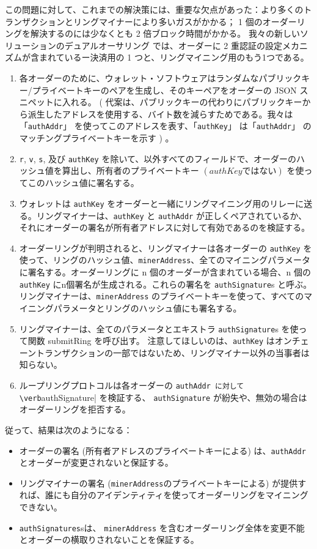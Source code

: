 \documentclass{article}
\begin{document}
\begin{multicols}{2}
この問題に対して、これまでの解決策には、重要な欠点があった：より多くのトランザクションとリングマイナーにより多いガスがかかる； 1 個のオーダーリングを解決するのには少なくとも 2 倍ブロック時間がかかる。 我々の新しいソリューションのデュアルオーサリング \cite{dualauthor} では、オーダーに 2 重認証の設定メカニズムが含まれているー決済用の 1 つと、リングマイニング用のもう1つである。

\begin{enumerate}
	\item 各オーダーのために、ウォレット・ソフトウェアはランダムなパブリックキー/プライベートキーのペアを生成し、そのキーペアをオーダーの JSON スニペットに入れる。 ( 代案は、パブリックキーの代わりにパブリックキーから派生したアドレスを使用する、バイト数を減らすためである。我々は「\verb|authAddr|」 を使ってこのアドレスを表す、「\verb|authKey|」 は「\verb|authAddr|」 のマッチングプライベートキーを示す ) 。
    \item \verb|r|, \verb|v|, \verb|s|, 及び \verb|authKey| を除いて、以外すべてのフィールドで、オーダーのハッシュ値を算出し、所有者のプライベートキー $\left(authKeyではない\right)$ を使ってこのハッシュ値に署名する。
	\item ウォレットは \verb|authKey| をオーダーと一緒にリングマイニング用のリレーに送る。リングマイナーは、\verb|authKey| と \verb|authAddr| が正しくペアされているか、それにオーダーの署名が所有者アドレスに対して有効であるのを検証する。
	\item オーダーリングが判明されると、リングマイナーは各オーダーの \verb|authKey| を使って、リングのハッシュ値、\verb|minerAddress|、全てのマイニングパラメータに署名する。オーダーリングに n 個のオーダーが含まれている場合、n 個の \verb|authKey| にn個署名が生成される。これらの署名を \verb|authSignature|s と呼ぶ。 リングマイナーは、\verb|minerAddress| のプライベートキーを使って、すべてのマイニングパラメータとリングのハッシュ値にも署名する。
	\item  リングマイナーは、全てのパラメータとエキストラ \verb|authSignature|s を使って関数 submitRing を呼び出す。 注意してほしいのは、\verb|authKey| はオンチェーントランザクションの一部ではないため、リングマイナー以外の当事者は知らない。
	\item ループリングプロトコルは各オーダーの \verb|authAddr に対して \verb|authSignature| を検証する、 \verb|authSignature| が紛失や、無効の場合はオーダーリングを拒否する。
\end{enumerate}
従って、結果は次のようになる：
\begin{itemize}
	\item  オーダーの署名 (所有者アドレスのプライベートキーによる) は、\verb|authAddr| とオーダーが変更されないと保証する。
	\item  リングマイナーの署名 (\verb|minerAddress|のプライベートキーによる) が提供すれば、誰にも自分のアイデンティティを使ってオーダーリングをマイニングできない。
	\item  \verb|authSignatures|sは、 \verb|minerAddress| を含むオーダーリング全体を変更不能とオーダーの横取りされないことを保証する。
\end{itemize}


\end{multicols}
\end{document}
